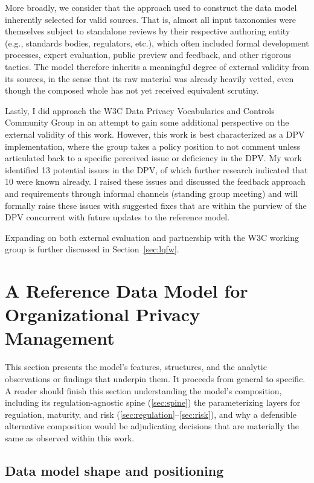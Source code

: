 \documentclass[10pt,letterpaper,twocolumn,twoside]{rho-class/rho}
\begin{document}
More broadly, we consider that the approach used to construct the data model inherently selected for valid sources. That is, almost all input taxonomies were themselves subject to standalone reviews by their respective authoring entity (e.g., standards bodies, regulators, etc.), which often included formal development processes, expert evaluation, public preview and feedback, and other rigorous tactics. The model therefore inherits a meaningful degree of external validity from its sources, in the sense that its raw material was already heavily vetted, even though the composed whole has not yet received equivalent scrutiny. 

Lastly, I did approach the W3C Data Privacy Vocabularies and Controls Community Group in an attempt to gain some additional perspective on the external validity of this work. However, this work is best characterized as a DPV implementation, where the group takes a policy position to not comment unless articulated back to a specific perceived issue or deficiency in the DPV. My work identified 13 potential issues in the DPV, of which further research indicated that 10 were known already. I raised these issues and discussed the feedback approach and requirements through informal channels (standing group meeting) and will formally raise these issues with suggested fixes that are within the purview of the DPV concurrent with future updates to the reference model.

Expanding on both external evaluation and partnership with the W3C working group is further discussed in Section~\ref{sec:lqfw}.

\section{A Reference Data Model for Organizational Privacy Management}\label{sec:model}

This section presents the model's features, structures, and the analytic observations or findings that underpin them. It proceeds from general to specific. A reader should finish this section understanding the model's composition, including its regulation-agnostic spine (\ref{sec:spine}) the parameterizing layers for regulation, maturity, and risk (\ref{sec:regulation}--\ref{sec:risk}), and why a defensible alternative composition would be adjudicating decisions that are materially the same as observed within this work.

\subsection{Data model shape and positioning}\label{sec:rings}
\end{document}
